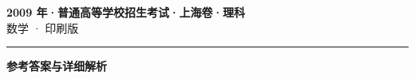 \documentclass[zihao=5, a4paper]{ctexart}
\begin{document}
\begin{center}
  {\Large\bfseries 2009 年·普通高等学校招生考试·上海卷·理科}\\[4pt]
  {\large 数学 · 印刷版}
\end{center}
\medskip
{}

\par\bigskip\hrule\bigskip
{}
\begin{center}{\large\bfseries 参考答案与详细解析}\end{center}
\smallskip

\end{document}
